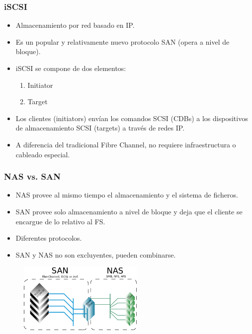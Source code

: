 \documentclass{beamer}
\begin{document}
\begin{frame}
  \frametitle{iSCSI}
  \begin{itemize}
    \item Almacenamiento por red basado en IP.
    \item Es un popular y relativamente nuevo protocolo SAN (opera a nivel de bloque).
    \item  iSCSI se compone de dos elementos:
  \begin{enumerate}
	\item Initiator
	\item Target
  \end{enumerate}
    \item Los clientes (\alert{initiators}) envían los comandos SCSI (CDBs) a los dispositivos de almacenamiento SCSI (\alert{targets}) a través de redes IP.
    \item A diferencia del tradicional Fibre Channel, no requiere infraestructura o cableado especial.
  \end{itemize}
\end{frame}


\begin{frame}
  \frametitle{NAS vs. SAN}
  \begin{itemize}
\small
    \item NAS provee  al mismo tiempo el almacenamiento y el sistema de ficheros.
    \item SAN provee solo almacenamiento a nivel de bloque y deja que el cliente se encargue de lo relativo al FS.  
    \item Diferentes protocolos.
    \item SAN y NAS no son excluyentes, pueden combinarse.
  \end{itemize}

\normalsize

\begin{figure}[h]
\begin{center}
  \includegraphics[width=6cm]{figs/SANvsNAS.png}
\end{center}
\end{figure}

\end{frame}
\end{document}
